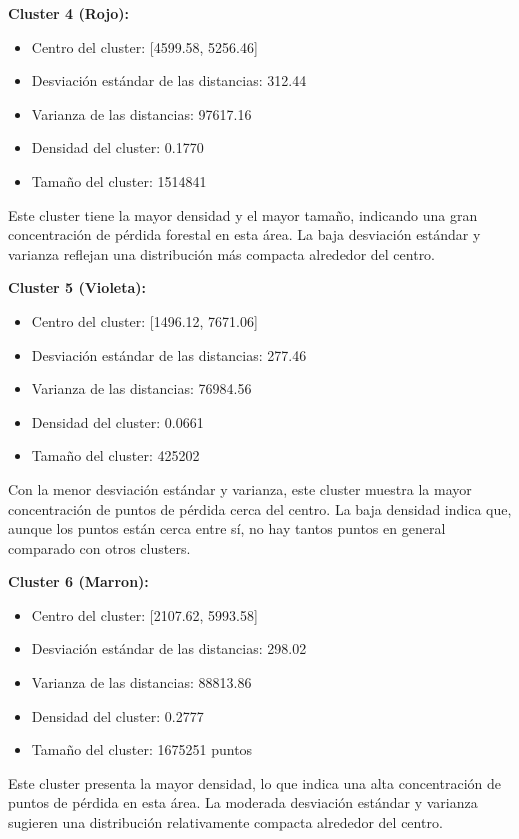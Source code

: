 \documentclass[11pt]{article}
\begin{document}
\textbf{Cluster 4 (Rojo):}
    \begin{itemize}
        \item Centro del cluster: [4599.58, 5256.46]
        \item Desviación estándar de las distancias: 312.44
        \item Varianza de las distancias: 97617.16
        \item Densidad del cluster: 0.1770
        \item Tamaño del cluster: 1514841
    \end{itemize}
Este cluster tiene la mayor densidad y el mayor tamaño, indicando una gran concentración de pérdida forestal en esta área. La baja desviación estándar y varianza reflejan una distribución más compacta alrededor del centro.

\textbf{Cluster 5 (Violeta):}
    \begin{itemize}
        \item Centro del cluster: [1496.12, 7671.06]
        \item Desviación estándar de las distancias: 277.46
        \item Varianza de las distancias: 76984.56
        \item Densidad del cluster: 0.0661
        \item Tamaño del cluster: 425202
    \end{itemize}
Con la menor desviación estándar y varianza, este cluster muestra la mayor concentración de puntos de pérdida cerca del centro. La baja densidad indica que, aunque los puntos están cerca entre sí, no hay tantos puntos en general comparado con otros clusters.

\textbf{Cluster 6 (Marron):}
    \begin{itemize}
        \item Centro del cluster: [2107.62, 5993.58]
        \item Desviación estándar de las distancias: 298.02
        \item Varianza de las distancias: 88813.86
        \item Densidad del cluster: 0.2777
        \item Tamaño del cluster: 1675251 puntos
    \end{itemize}
Este cluster presenta la mayor densidad, lo que indica una alta concentración de puntos de pérdida en esta área. La moderada desviación estándar y varianza sugieren una distribución relativamente compacta alrededor del centro.
\end{document}
